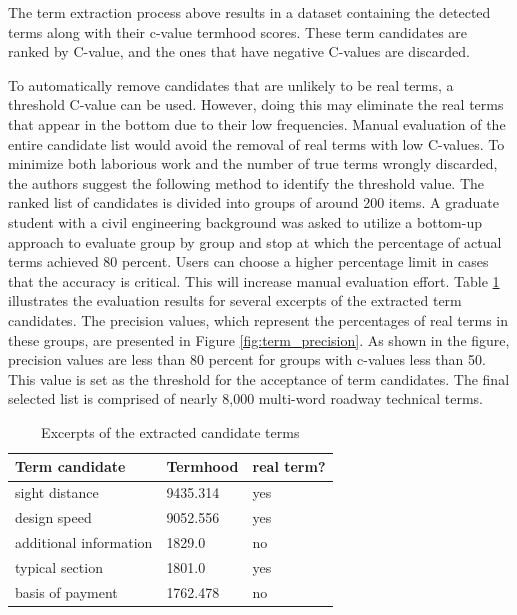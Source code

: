 \documentclass[Journal, BackFigs,NoLists, DoubleSpace]{ascelike}%
\begin{document}
%
\par
The term extraction process above results in a dataset containing the detected terms along with their c-value termhood scores. These term candidates are ranked by C-value, and the ones that have negative C-values are discarded.
\par
To automatically remove candidates that are unlikely to be real terms, a threshold C-value can be used. However, doing this may eliminate the real terms that appear in the bottom due to their low frequencies. Manual evaluation of the entire candidate list would avoid the removal of real terms with low C-values. To minimize both laborious work and the number of true terms wrongly discarded, the authors suggest the following method to identify the threshold value. The ranked list of candidates is divided into groups of around 200 items. A graduate student with a civil engineering background was asked to utilize a bottom-up approach to evaluate group by group and stop at which the percentage of actual terms achieved 80 percent. Users can choose a higher percentage limit in cases that the accuracy is critical. This will increase manual evaluation effort. Table \ref{table:term_evaluation} illustrates the evaluation results for several excerpts of the extracted term candidates. The precision values, which represent the percentages of real terms in these groups, are presented in Figure \ref{fig:term_precision}. As shown in the figure, precision values are less than 80 percent for groups with c-values less than 50. This value is set as the threshold for the acceptance of term candidates. The final selected list is comprised of nearly 8,000 multi-word roadway technical terms. 
%
\begin{table} [t]
	\caption{Excerpts of the extracted candidate terms}
	\label{table:term_evaluation}
	\centering
	\small
	\renewcommand{\arraystretch}{1.25}
	\begin{tabular}{l l l}
		\hline
		\textbf{Term candidate} & \textbf{Termhood} & \textbf{real term?}\\
		\hline
		sight distance		& 9435.314 & yes\\
		design speed & 9052.556 & yes \\
		additional information & 1829.0 & no\\
		typical section & 1801.0  & yes\\
		basis of payment & 1762.478 & no\\
		\hline
	\end{tabular}
	
	\normalsize
\end{table}
\end{document}
